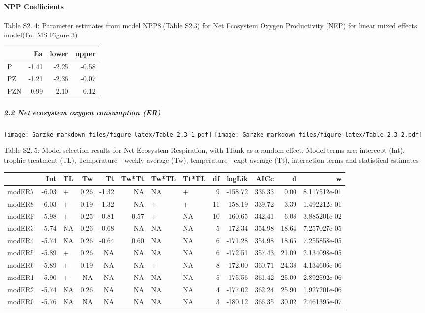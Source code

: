 \documentclass[]{article}
\let\oldparagraph\paragraph
\renewcommand{\paragraph}[1]{\oldparagraph{#1}\mbox{}}
\let\oldsubparagraph\subparagraph
\renewcommand{\subparagraph}[1]{\oldsubparagraph{#1}\mbox{}}
\begin{document}
\paragraph{NPP Coefficients}\label{npp-coefficients}

Table S2. 4: Parameter estimates from model NPP8 (Table S2.3) for Net
Ecosystem Oxygen Productivity (NEP) for linear mixed effects model(For
MS Figure 3)

\begin{longtable}[]{@{}lrrr@{}}
\toprule
& Ea & lower & upper\tabularnewline
\midrule
\endhead
P & -1.41 & -2.25 & -0.58\tabularnewline
PZ & -1.21 & -2.36 & -0.07\tabularnewline
PZN & -0.99 & -2.10 & 0.12\tabularnewline
\bottomrule
\end{longtable}

\subparagraph{2.2 Net ecosystem oxygen consumption
(ER)}\label{net-ecosystem-oxygen-consumption-er}

\texttt{[image: Garzke\_markdown\_files/figure-latex/Table\_2.3-1.pdf]}
\texttt{[image: Garzke\_markdown\_files/figure-latex/Table\_2.3-2.pdf]}

Table S2. 5: Model selection results for Net Ecosystem Respiration, with
1\textbar{}Tank as a random effect. Model terms are: intercept (Int),
trophic treatment (TL), Temperature - weekly average (Tw), temperature -
expt average (Tt), interaction terms and statistical estimates

\begin{longtable}[]{@{}lrlrrrllrrrrr@{}}
\toprule
& Int & TL & Tw & Tt & Tw*Tt & Tw*TL & Tt*TL & df & logLik & AICc & d &
w\tabularnewline
\midrule
\endhead
modER7 & -6.03 & + & 0.26 & -1.32 & NA & NA & + & 9 & -158.72 & 336.33 &
0.00 & 8.117512e-01\tabularnewline
modER8 & -6.03 & + & 0.19 & -1.32 & NA & + & + & 11 & -158.19 & 339.72 &
3.39 & 1.492212e-01\tabularnewline
modERF & -5.98 & + & 0.25 & -0.81 & 0.57 & + & NA & 10 & -160.65 &
342.41 & 6.08 & 3.885201e-02\tabularnewline
modER3 & -5.74 & NA & 0.26 & -0.68 & NA & NA & NA & 5 & -172.34 & 354.98
& 18.64 & 7.257027e-05\tabularnewline
modER4 & -5.74 & NA & 0.26 & -0.64 & 0.60 & NA & NA & 6 & -171.28 &
354.98 & 18.65 & 7.255858e-05\tabularnewline
modER5 & -5.89 & + & 0.26 & NA & NA & NA & NA & 6 & -172.51 & 357.43 &
21.09 & 2.134098e-05\tabularnewline
modER6 & -5.89 & + & 0.19 & NA & NA & + & NA & 8 & -172.00 & 360.71 &
24.38 & 4.134606e-06\tabularnewline
modER1 & -5.90 & + & NA & NA & NA & NA & NA & 5 & -175.56 & 361.42 &
25.09 & 2.892592e-06\tabularnewline
modER2 & -5.74 & NA & 0.26 & NA & NA & NA & NA & 4 & -177.02 & 362.24 &
25.90 & 1.927201e-06\tabularnewline
modER0 & -5.76 & NA & NA & NA & NA & NA & NA & 3 & -180.12 & 366.35 &
30.02 & 2.461395e-07\tabularnewline
\bottomrule
\end{longtable}
\end{document}
